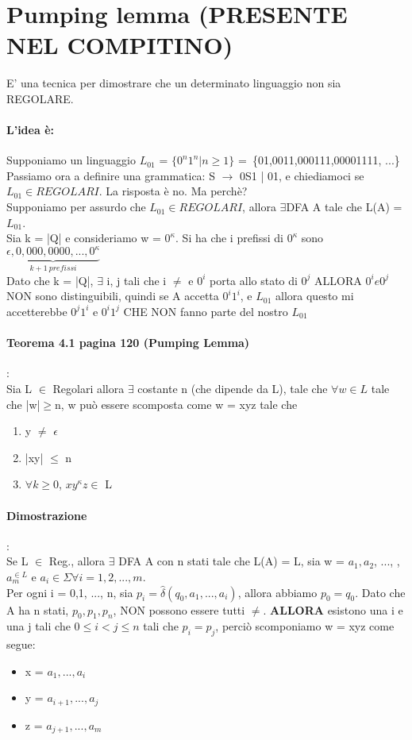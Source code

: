\documentclass[12pt, a4paper, openany, oneside]{book}
\begin{document}
\section{Pumping lemma (PRESENTE NEL COMPITINO)}
E' una tecnica per dimostrare che un determinato linguaggio non sia REGOLARE.
\paragraph{L'idea è: }Supponiamo un linguaggio $L_{01}$ = $\{0^n 1^n | n\geq 1\}$
= \{01,0011,000111,00001111, ...\}\\
Passiamo ora a definire una grammatica: S $\to$ 0S1 | 01, e chiediamoci se 
$L_{01} \in REGOLARI$. La risposta è no. Ma perchè?\\
Supponiamo per assurdo che $L_{01} \in REGOLARI$, allora $\exists$DFA A tale che
L(A) = $L_{01}$. \\
Sia k = |Q| e consideriamo w = $0^{\kappa}$. Si ha che i prefissi di $0^\kappa$ 
sono $\underbrace{\epsilon, 0, 000, 0000, ..., 0^{\kappa}}_{k+1 ~ prefissi}$\\
Dato che k = |Q|, $\exists$ i, j  tali che i $\neq$ e $0^{i}$ porta allo stato di
$0^{j}$ ALLORA $0^{i} e 0^{j}$ NON sono distinguibili, quindi se A accetta $0^{i}1^{i}$,
e $L_{01}$ allora questo mi accetterebbe $0^{j}1^{i}$ e $0^{i}1^{j}$ CHE NON fanno
parte del nostro $L_{01}$
\paragraph{Teorema 4.1 pagina 120 (Pumping Lemma)}: \\
Sia L $\in$ Regolari allora $\exists$ costante n (che dipende da L), tale che
$\forall w \in L$ tale che |w|$\geq$n, w può essere scomposta come w = xyz tale
che 
\begin{enumerate}
	\item y $\neq$ $\epsilon$
	\item |xy| $\leq$ n
	\item $\forall k \geq 0$, $xy^{\kappa}z \in$ L
\end{enumerate}
\paragraph{Dimostrazione}:\\
Se L $\in$ Reg., allora $\exists$ DFA A con n stati tale che L(A) = L, sia w =
$a_{1}, a_2$, ..., 
, $a_{m}^{\in L}$ e $a_{i} \in \Sigma \forall i = 1, 2, ..., m$.\\
Per ogni i = 0,1, ..., n, sia $p_{i} = \widehat{\delta}(q_0, a_1, ..., a_i)$, allora
abbiamo $p_0 = q_0$. Dato che A ha n stati, $p_0, p_1, p_n$, NON possono essere tutti
$\neq$.
\textbf{ALLORA} esistono una i e una j tali che $0 \leq i < j \leq n$ tali che $p_i
= p_j$, perciò scomponiamo w = xyz come segue:
\begin{itemize}
	\item x = $a_1, ..., a_{i}$
	\item y = $a_{i+1}, ..., a_{j}$
	\item z = $a_{j+1}, ..., a_{m}$
\end{itemize}
\end{document}
